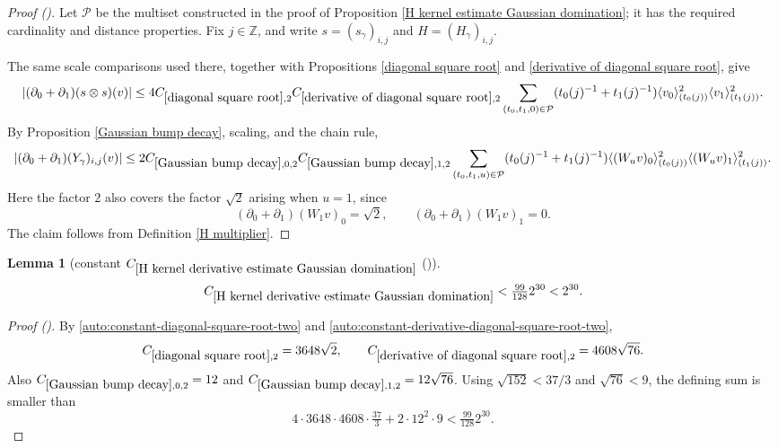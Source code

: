 \documentclass[12pt,reqno]{amsart}
\newcommand{\auto}{{({\tiny\faCar})}}
\theoremstyle{plain}
\newtheorem{lemma}[theorem]{Lemma}
\numberwithin{equation}{section}
\theoremstyle{remark}
\newcommand{\using}[1]{}
\newcommand{\Z}{{\mathbb Z}}
\begin{document}
\begin{proof}[Proof \auto]
Let $\mathcal P$ be the multiset constructed in the proof of
Proposition \ref{H kernel estimate Gaussian domination}; it has the
required cardinality and distance properties. Fix $j\in\Z$, and write
$s=(s_\gamma)_{i,j}$ and $H=(H_\gamma)_{i,j}$.

The same scale comparisons used there, together with Propositions
\ref{diagonal square root} and
\ref{derivative of diagonal square root}, give
\[
|(\partial_0+\partial_1)(s\otimes s)(v)|
\le
4C_{\ref{diagonal square root},2}
C_{\ref{derivative of diagonal square root},2}
\sum_{(t_0,t_1,0)\in\mathcal P}
(t_0(j)^{-1}+t_1(j)^{-1})
\langle v_0\rangle_{(t_0(j))}^2
\langle v_1\rangle_{(t_1(j))}^2.
\]
By Proposition \ref{Gaussian bump decay}, scaling, and the chain rule,
\[
|(\partial_0+\partial_1)(Y_\gamma)_{i,j}(v)|
\le
2C_{\ref{Gaussian bump decay},0,2}
C_{\ref{Gaussian bump decay},1,2}
\sum_{(t_0,t_1,u)\in\mathcal P}
(t_0(j)^{-1}+t_1(j)^{-1})
\langle (W_uv)_0\rangle_{(t_0(j))}^2
\langle (W_uv)_1\rangle_{(t_1(j))}^2.
\]
Here the factor $2$ also covers the factor $\sqrt2$ arising when
$u=1$, since
\[
(\partial_0+\partial_1)(W_1v)_0=\sqrt2,
\qquad
(\partial_0+\partial_1)(W_1v)_1=0.
\]
The claim follows from Definition \ref{H multiplier}.
\end{proof}

\begin{lemma}[constant $C_{\ref{H kernel derivative estimate Gaussian domination}}$ \auto]\label{constant H kernel derivative estimate Gaussian domination}\using{constant diagonal square root}\using{constant derivative diagonal square root}\using{diagonal square root}\using{derivative of diagonal square root}\using{Gaussian bump decay}
\begin{equation}\label{constant H kernel derivative estimate Gaussian domination bound}
C_{\ref{H kernel derivative estimate Gaussian domination}}
<\tfrac{99}{128}2^{30}<2^{30}.
\end{equation}
\end{lemma}
\begin{proof}[Proof \auto]
By \eqref{auto:constant-diagonal-square-root-two} and \eqref{auto:constant-derivative-diagonal-square-root-two},
\[
C_{\ref{diagonal square root},2}=3648\sqrt2,
\qquad
C_{\ref{derivative of diagonal square root},2}=4608\sqrt{76}.
\]
Also $C_{\ref{Gaussian bump decay},0,2}=12$ and
$C_{\ref{Gaussian bump decay},1,2}=12\sqrt{76}$. Using $\sqrt{152}<37/3$ and $\sqrt{76}<9$, the defining sum is smaller than
\[
4\cdot3648\cdot4608\cdot\tfrac{37}{3}+2\cdot12^2\cdot9
<\tfrac{99}{128}2^{30}.
\]
\end{proof}
\end{document}
